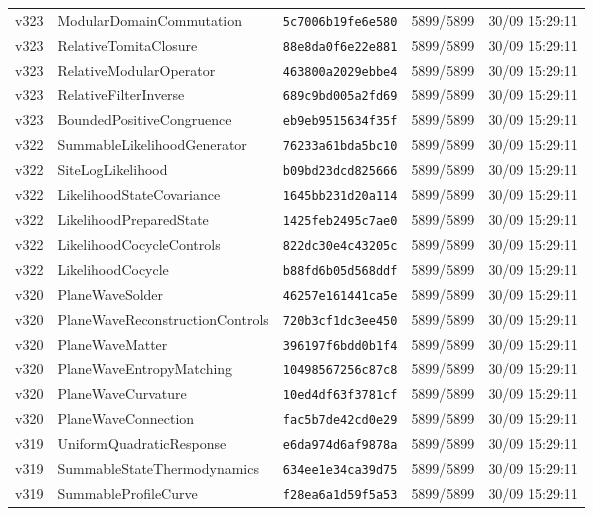 \documentclass[11pt]{article}
\theoremstyle{definition}\newtheorem{deriv}{Derivação}
\begin{document}
{\begin{longtable}{@{}lllll@{}}
v323 & ModularDomainCommutation & \texttt{5c7006b19fe6e580} & 5899/5899 & 30/09 15:29:11 \\
v323 & RelativeTomitaClosure & \texttt{88e8da0f6e22e881} & 5899/5899 & 30/09 15:29:11 \\
v323 & RelativeModularOperator & \texttt{463800a2029ebbe4} & 5899/5899 & 30/09 15:29:11 \\
v323 & RelativeFilterInverse & \texttt{689c9bd005a2fd69} & 5899/5899 & 30/09 15:29:11 \\
v323 & BoundedPositiveCongruence & \texttt{eb9eb9515634f35f} & 5899/5899 & 30/09 15:29:11 \\
v322 & SummableLikelihoodGenerator & \texttt{76233a61bda5bc10} & 5899/5899 & 30/09 15:29:11 \\
v322 & SiteLogLikelihood & \texttt{b09bd23dcd825666} & 5899/5899 & 30/09 15:29:11 \\
v322 & LikelihoodStateCovariance & \texttt{1645bb231d20a114} & 5899/5899 & 30/09 15:29:11 \\
v322 & LikelihoodPreparedState & \texttt{1425feb2495c7ae0} & 5899/5899 & 30/09 15:29:11 \\
v322 & LikelihoodCocycleControls & \texttt{822dc30e4c43205c} & 5899/5899 & 30/09 15:29:11 \\
v322 & LikelihoodCocycle & \texttt{b88fd6b05d568ddf} & 5899/5899 & 30/09 15:29:11 \\
v320 & PlaneWaveSolder & \texttt{46257e161441ca5e} & 5899/5899 & 30/09 15:29:11 \\
v320 & PlaneWaveReconstructionControls & \texttt{720b3cf1dc3ee450} & 5899/5899 & 30/09 15:29:11 \\
v320 & PlaneWaveMatter & \texttt{396197f6bdd0b1f4} & 5899/5899 & 30/09 15:29:11 \\
v320 & PlaneWaveEntropyMatching & \texttt{10498567256c87c8} & 5899/5899 & 30/09 15:29:11 \\
v320 & PlaneWaveCurvature & \texttt{10ed4df63f3781cf} & 5899/5899 & 30/09 15:29:11 \\
v320 & PlaneWaveConnection & \texttt{fac5b7de42cd0e29} & 5899/5899 & 30/09 15:29:11 \\
v319 & UniformQuadraticResponse & \texttt{e6da974d6af9878a} & 5899/5899 & 30/09 15:29:11 \\
v319 & SummableStateThermodynamics & \texttt{634ee1e34ca39d75} & 5899/5899 & 30/09 15:29:11 \\
v319 & SummableProfileCurve & \texttt{f28ea6a1d59f5a53} & 5899/5899 & 30/09 15:29:11 \\

\end{longtable}}
\end{document}
